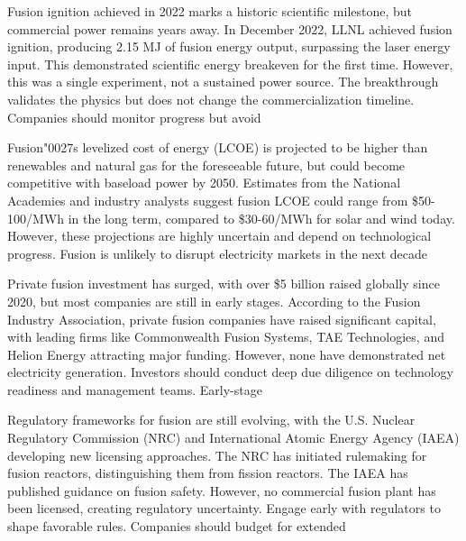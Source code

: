 \documentclass[10pt,a4paper]{article}
\newcommand{\BOApos}{{\BOQuoteFont\char"0027}}
\begin{document}
\begin{minipage}[t]{0.46\linewidth}
{\small Fusion ignition achieved in 2022 marks a historic scientific milestone, but commercial power remains years away. In December 2022, LLNL achieved fusion ignition, producing 2.15 MJ of fusion energy output, surpassing the laser energy input. This demonstrated scientific energy breakeven for the first time. However, this was a single experiment, not a sustained power source. The breakthrough validates the physics but does not change the commercialization timeline. Companies should monitor progress but avoid}\par
{\small Fusion\BOApos{}s levelized cost of energy (LCOE) is projected to be higher than renewables and natural gas for the foreseeable future, but could become competitive with baseload power by 2050. Estimates from the National Academies and industry analysts suggest fusion LCOE could range from \$50-100/MWh in the long term, compared to \$30-60/MWh for solar and wind today. However, these projections are highly uncertain and depend on technological progress. Fusion is unlikely to disrupt electricity markets in the next decade}\par
\end{minipage}\hfill\begin{minipage}[t]{0.46\linewidth}
{\small Private fusion investment has surged, with over \$5 billion raised globally since 2020, but most companies are still in early stages. According to the Fusion Industry Association, private fusion companies have raised significant capital, with leading firms like Commonwealth Fusion Systems, TAE Technologies, and Helion Energy attracting major funding. However, none have demonstrated net electricity generation. Investors should conduct deep due diligence on technology readiness and management teams. Early-stage}\par
{\small Regulatory frameworks for fusion are still evolving, with the U.S. Nuclear Regulatory Commission (NRC) and International Atomic Energy Agency (IAEA) developing new licensing approaches. The NRC has initiated rulemaking for fusion reactors, distinguishing them from fission reactors. The IAEA has published guidance on fusion safety. However, no commercial fusion plant has been licensed, creating regulatory uncertainty. Engage early with regulators to shape favorable rules. Companies should budget for extended}\par
\end{minipage}
\end{document}
